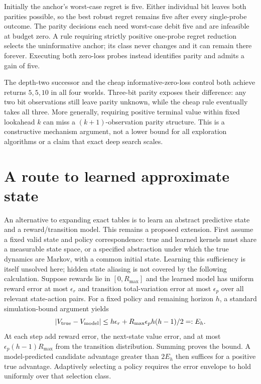 \documentclass[10pt,twocolumn]{article}
\begin{document}
Initially the anchor's worst-case regret is five. Either individual bit leaves
both parities possible, so the best robust regret remains five after every
single-probe outcome. The parity decisions each need worst-case debit five
and are infeasible at budget zero. A rule requiring strictly positive one-probe
regret reduction selects the uninformative anchor; its class never changes and
it can remain there forever. Executing both zero-loss probes instead identifies
parity and admits a gain of five.

The depth-two successor and the cheap informative-zero-loss control both
achieve returns $5,5,10$ in all four worlds. Three-bit parity exposes their
difference: any two bit observations still leave parity unknown, while the
cheap rule eventually takes all three. More generally, requiring positive
terminal value within fixed lookahead $k$ can miss a $(k+1)$-observation parity
structure. This is a constructive mechanism argument, not a lower bound for
all exploration algorithms or a claim that exact deep search scales.

\section{A route to learned approximate state}\label{app:abstraction}
An alternative to expanding exact tables is to learn an abstract predictive
state and a reward/transition model. This remains a proposed extension.
First assume a fixed valid state and policy correspondence: true and learned
kernels must share a measurable state space, or a specified abstraction under
which the true dynamics are Markov, with a common initial state. Learning this
sufficiency is itself unsolved here; hidden state aliasing is not covered by
the following calculation. Suppose rewards lie in $[0,R_{\max}]$ and the learned model has uniform reward
error at most $\epsilon_r$ and transition total-variation error at most
$\epsilon_p$ over all relevant state-action pairs. For a fixed policy and
remaining horizon $h$, a standard simulation-bound argument yields
\begin{equation}
 |V_{\rm true}-V_{\rm model}|
 \leq h\epsilon_r+R_{\max}\epsilon_p h(h-1)/2=:E_h.
\end{equation}
At each step add reward error, the next-state value error, and at most
$\epsilon_p(h-1)R_{\max}$ from the transition distribution. Summing proves the
bound. A model-predicted candidate advantage greater than $2E_h$ then suffices
for a positive true advantage. Adaptively selecting a policy requires the
error envelope to hold uniformly over that selection class.
\end{document}
